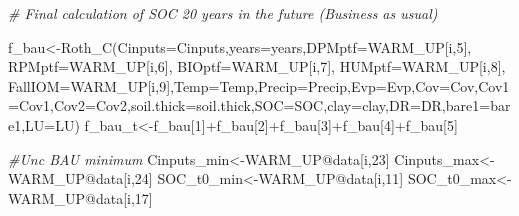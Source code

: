 \documentclass[
  10pt,
  b5paper,
]{book}
\newenvironment{Shaded}{\begin{snugshade}}{\end{snugshade}}
\newcommand{\AttributeTok}[1]{\textcolor[rgb]{0.77,0.63,0.00}{#1}}
\newcommand{\CommentTok}[1]{\textcolor[rgb]{0.56,0.35,0.01}{\textit{#1}}}
\newcommand{\DecValTok}[1]{\textcolor[rgb]{0.00,0.00,0.81}{#1}}
\newcommand{\FunctionTok}[1]{\textcolor[rgb]{0.00,0.00,0.00}{#1}}
\newcommand{\NormalTok}[1]{#1}
\newcommand{\OtherTok}[1]{\textcolor[rgb]{0.56,0.35,0.01}{#1}}
\newcommand{\SpecialCharTok}[1]{\textcolor[rgb]{0.00,0.00,0.00}{#1}}
\begin{document}
\begin{Shaded}
\begin{Highlighting}[]
\CommentTok{\# Final calculation of SOC  20 years in the future  (Business as usual)}

\NormalTok{f\_bau}\OtherTok{\textless{}{-}}\FunctionTok{Roth\_C}\NormalTok{(}\AttributeTok{Cinputs=}\NormalTok{Cinputs,}\AttributeTok{years=}\NormalTok{years,}\AttributeTok{DPMptf=}\NormalTok{WARM\_UP[i,}\DecValTok{5}\NormalTok{], }\AttributeTok{RPMptf=}\NormalTok{WARM\_UP[i,}\DecValTok{6}\NormalTok{], }\AttributeTok{BIOptf=}\NormalTok{WARM\_UP[i,}\DecValTok{7}\NormalTok{], }\AttributeTok{HUMptf=}\NormalTok{WARM\_UP[i,}\DecValTok{8}\NormalTok{], }\AttributeTok{FallIOM=}\NormalTok{WARM\_UP[i,}\DecValTok{9}\NormalTok{],}\AttributeTok{Temp=}\NormalTok{Temp,}\AttributeTok{Precip=}\NormalTok{Precip,}\AttributeTok{Evp=}\NormalTok{Evp,}\AttributeTok{Cov=}\NormalTok{Cov,}\AttributeTok{Cov1=}\NormalTok{Cov1,}\AttributeTok{Cov2=}\NormalTok{Cov2,}\AttributeTok{soil.thick=}\NormalTok{soil.thick,}\AttributeTok{SOC=}\NormalTok{SOC,}\AttributeTok{clay=}\NormalTok{clay,}\AttributeTok{DR=}\NormalTok{DR,}\AttributeTok{bare1=}\NormalTok{bare1,}\AttributeTok{LU=}\NormalTok{LU)}
\NormalTok{f\_bau\_t}\OtherTok{\textless{}{-}}\NormalTok{f\_bau[}\DecValTok{1}\NormalTok{]}\SpecialCharTok{+}\NormalTok{f\_bau[}\DecValTok{2}\NormalTok{]}\SpecialCharTok{+}\NormalTok{f\_bau[}\DecValTok{3}\NormalTok{]}\SpecialCharTok{+}\NormalTok{f\_bau[}\DecValTok{4}\NormalTok{]}\SpecialCharTok{+}\NormalTok{f\_bau[}\DecValTok{5}\NormalTok{]}

\CommentTok{\#Unc BAU minimum }
\NormalTok{Cinputs\_min}\OtherTok{\textless{}{-}}\NormalTok{WARM\_UP}\SpecialCharTok{@}\NormalTok{data[i,}\DecValTok{23}\NormalTok{]}
\NormalTok{Cinputs\_max}\OtherTok{\textless{}{-}}\NormalTok{WARM\_UP}\SpecialCharTok{@}\NormalTok{data[i,}\DecValTok{24}\NormalTok{]}
\NormalTok{SOC\_t0\_min}\OtherTok{\textless{}{-}}\NormalTok{WARM\_UP}\SpecialCharTok{@}\NormalTok{data[i,}\DecValTok{11}\NormalTok{]}
\NormalTok{SOC\_t0\_max}\OtherTok{\textless{}{-}}\NormalTok{WARM\_UP}\SpecialCharTok{@}\NormalTok{data[i,}\DecValTok{17}\NormalTok{]}


\end{Highlighting}
\end{Shaded}
\end{document}
